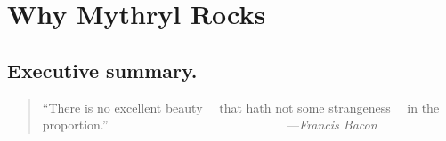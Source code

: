 \chapter{Why Mythryl Rocks}

%
%

\section{Executive summary.}

\begin{quote}\begin{tiny}
                 ``There is no excellent beauty\newline
                 ~~that hath not some strangeness\newline
                 ~~in the proportion.''\newline
                 ~~~~~~~~~~~~~~~~~~~~~~~~~~~~---{\em Francis Bacon}

\end{tiny}\end{quote}


